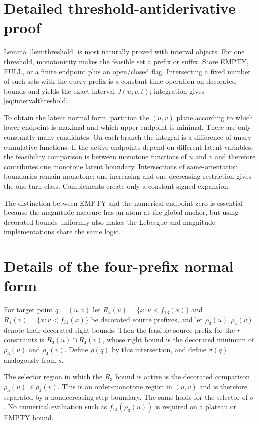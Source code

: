 \documentclass[12pt,a4paper]{article}
\theoremstyle{definition}
\newcommand{\1}{\mathbf 1}
\begin{document}
\section{Detailed threshold-antiderivative proof}                  \label{app:thresholdproof}

Lemma~\ref{lem:threshold} is most naturally proved with interval objects.  For one threshold, monotonicity makes the feasible set a prefix or suffix.  Store EMPTY, FULL, or a finite endpoint plus an open/closed flag.  Intersecting a fixed number of such sets with the query prefix is a constant-time operation on decorated bounds and yields the exact interval $J(u,v,t)$; integration gives \eqref{eq:intervalthreshold}.

To obtain the latent normal form, partition the $(u,v)$ plane according to which lower endpoint is maximal and which upper endpoint is minimal.  There are only constantly many candidates.  On each branch the integral is a difference of unary cumulative functions.  If the active endpoints depend on different latent variables, the feasibility comparison is between monotone functions of $u$ and $v$ and therefore contributes one monotone latent boundary.  Intersections of same-orientation boundaries remain monotone; one increasing and one decreasing restriction gives the one-turn class.  Complements create only a constant signed expansion.

The distinction between EMPTY and the numerical endpoint zero is essential because the magnitude measure has an atom at the global anchor, but using decorated bounds uniformly also makes the Lebesgue and magnitude implementations share the same logic.

\section{Details of the four-prefix normal form}                   \label{app:prefix}

For target point $q=(u,v)$ let $R_3(u)=\{x:u<f_{13}(x)\}$ and $R_4(v)=\{x:v<f_{14}(x)\}$ be decorated source prefixes, and let $\rho_3(u),\rho_4(v)$ denote their decorated right bounds.  Then the feasible source prefix for the $r$-constraints is $R_3(u)\cap R_4(v)$, whose right bound is the decorated minimum of $\rho_3(u)$ and $\rho_4(v)$.  Define $\rho(q)$ by this intersection, and define $\sigma(q)$ analogously from $s$.

The selector region in which the $R_3$ bound is active is the decorated comparison $\rho_3(u)\preceq\rho_4(v)$.  This is an order-monotone region in $(u,v)$ and is therefore separated by a nondecreasing step boundary.  The same holds for the selector of $\sigma$.  No numerical evaluation such as $f_{14}(\rho_3(u))$ is required on a plateau or EMPTY bound.
\end{document}
